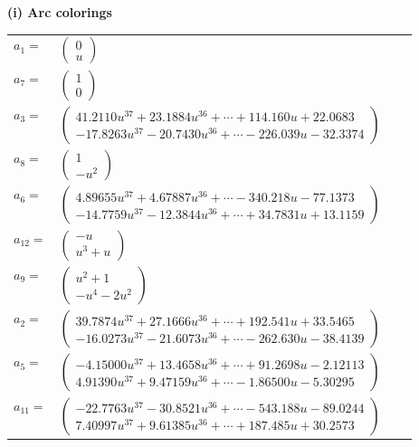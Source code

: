 \documentclass[1p]{elsarticle_modified}
\theoremstyle{definition}
\begin{document}
\flushleft \textbf{(i) Arc colorings}\\
\begin{tabular}{m{7pt} m{180pt} m{7pt} m{180pt} }
\flushright $a_{1}=$&$\begin{pmatrix}0\\u\end{pmatrix}$ \\
\flushright $a_{7}=$&$\begin{pmatrix}1\\0\end{pmatrix}$ \\
\flushright $a_{3}=$&$\begin{pmatrix}41.2110 u^{37}+23.1884 u^{36}+\cdots+114.160 u+22.0683\\-17.8263 u^{37}-20.7430 u^{36}+\cdots-226.039 u-32.3374\end{pmatrix}$ \\
\flushright $a_{8}=$&$\begin{pmatrix}1\\- u^2\end{pmatrix}$ \\
\flushright $a_{6}=$&$\begin{pmatrix}4.89655 u^{37}+4.67887 u^{36}+\cdots-340.218 u-77.1373\\-14.7759 u^{37}-12.3844 u^{36}+\cdots+34.7831 u+13.1159\end{pmatrix}$ \\
\flushright $a_{12}=$&$\begin{pmatrix}- u\\u^3+u\end{pmatrix}$ \\
\flushright $a_{9}=$&$\begin{pmatrix}u^2+1\\- u^4-2 u^2\end{pmatrix}$ \\
\flushright $a_{2}=$&$\begin{pmatrix}39.7874 u^{37}+27.1666 u^{36}+\cdots+192.541 u+33.5465\\-16.0273 u^{37}-21.6073 u^{36}+\cdots-262.630 u-38.4139\end{pmatrix}$ \\
\flushright $a_{5}=$&$\begin{pmatrix}-4.15000 u^{37}+13.4658 u^{36}+\cdots+91.2698 u-2.12113\\4.91390 u^{37}+9.47159 u^{36}+\cdots-1.86500 u-5.30295\end{pmatrix}$ \\
\flushright $a_{11}=$&$\begin{pmatrix}-22.7763 u^{37}-30.8521 u^{36}+\cdots-543.188 u-89.0244\\7.40997 u^{37}+9.61385 u^{36}+\cdots+187.485 u+30.2573\end{pmatrix}$ \\

\end{tabular}
\end{document}
